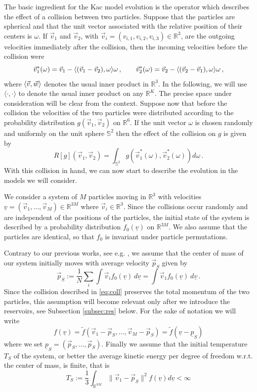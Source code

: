 \documentclass{article}
\newcommand*\R{ \mathds{R} }
\newcommand\uv{{\underline v}}
\newcommand\vv{{\vec v}}
\newcommand\vw{{\vec w}}
\DeclarePairedDelimiter{\scal}{\langle}{\rangle}
\begin{document}
The basic ingredient for the Kac model evolution is the operator which describes the effect of a collision between two
particles. Suppose that the particles are spherical and that the unit vector associated with the relative position of
their centers is $\omega$. If $\vec v_1$ and $\vec v_2$, with $\vec v_i=(v_{i,1}, v_{i,2}, v_{i,3})\in\R^3$, are the 
outgoing velocities immediately after the collision, then the incoming velocities before the
collision were 
\begin{equation}\label{eq:coll}
\vec v_1^*(\omega)=\vec v_1-\scal{(\vec v_1-\vec v_2),\omega}\omega\,,\qquad \vec v_2^*(\omega)=\vec
v_2-\scal{(\vec v_2-\vec v_1),\omega}\omega\, ,
\end{equation}
%
where $\scal{\vv,\vw}$ denotes the usual inner product in $\mathds R^3$. In the following, we will use $\langle \cdot,
\cdot \rangle$ to denote the usual inner product on any $\R^K$. The precise space under
consideration will be clear from the context. Suppose now that before the collision the velocities of the two particles
were distributed according to the probability distribution $g(\vec v_1,\vec v_2)$ on $\R^6$. If the unit vector $\omega$
is chosen randomly and uniformly on the unit sphere $\mathds S^2$ then the effect of the collision on $g$ is given by %
\begin{equation}\label{eq:defR}
	R[g](\vec v_1,\vec v_2)=\int_{\mathds S^2}g(\vec v_1^*(\omega),\vec v_2^*(\omega))d\omega\, .
\end{equation}
%
With this collision in hand, we can now start to describe the evolution in the models we will consider. 

We consider a system of $M$ particles moving in $\R^3$ with velocities $\uv=(\vv_1,\ldots,\vv_M)\in\R^{3M}$ where
$\vv_i\in\R^3$. Since the collisions occur randomly and are independent of the positions of the particles, the initial
state of the system is described by a probability distribution $f_0(\uv)$ on $\R^{3M}$. We also assume that the
particles are identical, so that $f_0$ is invariant under particle permutations. 

Contrary to our previous works, see e.g. \cite{BLP25, BLTV}, we assume that the center of mass of our system initially
moves with average velocity $\vec p_S$ given by %
\[
\vec p_S:=\frac1N\sum_i\int \vv_if_0(\uv) \ d\uv = \int \vv_1 f_0(\uv) \ d\uv \, .
\]
%
Since the collision described in \eqref{eq:coll} preserves the total momentum of the two particles, this assumption will
become relevant only after we introduce the reservoirs, see Subsection \ref{subsec:res} below. For the sake of notation 
we will write %
\begin{equation}\label{eq:centered}
f(\uv)=\tilde f(\vv_1-\vec p_S,\ldots,\vv_M-\vec p_S)=\tilde f(\uv-\underline p_S)
\end{equation}
% 
where we set $\underline p_S=(\vec p_S,\ldots,\vec p_S )$. Finally we assume that the initial temperature $T_S$ of the 
system, or better the average kinetic energy per degree of freedom w.r.t. the center of mass, is finite, that is
\[
T_S:=\frac13\int_{\R^{3M}}\|\vv_1-\vec p_S\|^2 f(\uv)d\uv<\infty
\]
\end{document}

